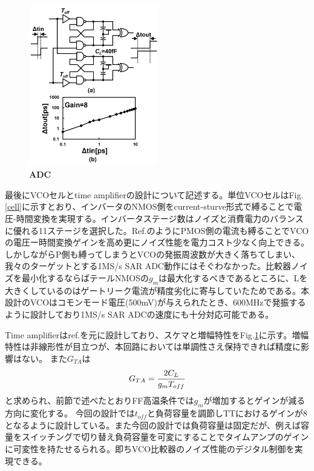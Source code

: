 \documentclass[letterpaper, 10 pt, conference]{ieeeconf}  %
\begin{document}
\begin{figure}[ht!]
\centering
 \includegraphics[width=0.5\textwidth]{figs/ta_chara.png}
  \captionsetup{font=footnotesize}
  \caption{\textbf{ADC}}
  \label{timeamp}
\end{figure}

最後にVCOセルとtime amplifierの設計について記述する。単位VCOセルはFig.\ref{cell}に示すとおり、インバータのNMOS側をcurrent-sturve形式で縛ることで電圧-時間変換を実現する。インバータステージ数はノイズと消費電力のバランスに優れる11ステージを選択した。Ref.\cite{timecomp}のようにPMOS側の電流も縛ることでVCOの電圧ー時間変換ゲインを高め更にノイズ性能を電力コスト少なく向上できる。しかしながらP側も縛ってしまうとVCOの発振周波数が大きく落ちてしまい、我々のターゲットとする1MS/s SAR ADC動作にはそぐわなかった。比較器ノイズを最小化するならばテールNMOSの$g_m$は最大化するべきであるところに、Lを大きくしているのはゲートリーク電流が精度劣化に寄与していたためである。本設計のVCOはコモンモード電圧(500mV)が与えられたとき、600MHzで発振するように設計しており1MS/s SAR ADCの速度にも十分対応可能である。

Time amplifierはref.\cite{lee20089}を元に設計しており、スケマと増幅特性をFig.\ref{timeamp}に示す。増幅特性は非線形性が目立つが、本回路においては単調性さえ保持できれば精度に影響はない。
また$G_{TA}$は
\begin{eqnarray}
    \centering
    G_{TA} = \frac{2C_L}{g_mT_{off}}
    \label{gta}
\end{eqnarray}
と求められ\cite{lee20089}、前節で述べたとおりFF高温条件では$g_m$が増加するとゲインが減る方向に変化する。
今回の設計では$t_{off}$と負荷容量を調節しTTにおけるゲインが8となるように設計している。また今回の設計では負荷容量は固定だが、例えば容量をスイッチングで切り替え負荷容量を可変にすることでタイムアンプのゲインに可変性を持たせるられる。即ちVCO比較器のノイズ性能のデジタル制御を実現できる。
\end{document}
